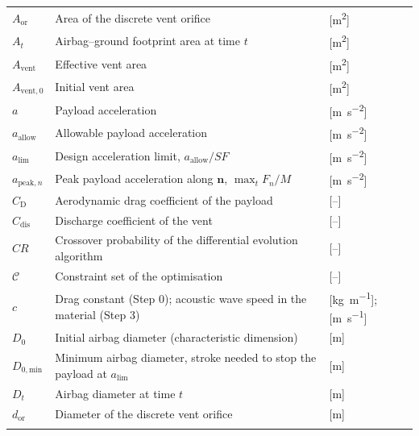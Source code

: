 {\longtablesetup
\begin{longtable}{L{0.16} L{0.64} L{0.20}}
\headrow{} &  &  \\
\endhead
{}
\endfoot
\lastrule
\endlastfoot
$A_\text{or}$ & Area of the discrete vent orifice & [\si{\metre\squared}] \\
$A_t$ & Airbag--ground footprint area at time $t$ & [\si{\metre\squared}] \\
$A_\text{vent}$ & Effective vent area & [\si{\metre\squared}] \\
$A_{\text{vent},0}$ & Initial vent area & [\si{\metre\squared}] \\
$a$ & Payload acceleration & [\si{\metre\per\second\squared}] \\
$a_\text{allow}$ & Allowable payload acceleration & [\si{\metre\per\second\squared}] \\
$a_\text{lim}$ & Design acceleration limit, $a_\text{allow}/\mathit{SF}$ & [\si{\metre\per\second\squared}] \\
$a_{\text{peak},n}$ & Peak payload acceleration along $\mathbf{n}$, $\max_t F_n/M$ & [\si{\metre\per\second\squared}] \\
$C_\text{D}$ & Aerodynamic drag coefficient of the payload & [--] \\
$C_\text{dis}$ & Discharge coefficient of the vent & [--] \\
$CR$ & Crossover probability of the differential evolution algorithm & [--] \\
$\mathcal{C}$ & Constraint set of the optimisation & [--] \\
$c$ & Drag constant (Step 0); acoustic wave speed in the material (Step 3) & [\si{\kilogram\per\metre}]; [\si{\metre\per\second}] \\
$D_0$ & Initial airbag diameter (characteristic dimension) & [\si{\metre}] \\
$D_{0,\text{min}}$ & Minimum airbag diameter, stroke needed to stop the payload at $a_\text{lim}$ & [\si{\metre}] \\
$D_t$ & Airbag diameter at time $t$ & [\si{\metre}] \\
$d_\text{or}$ & Diameter of the discrete vent orifice & [\si{\metre}] \\

\end{longtable}}
